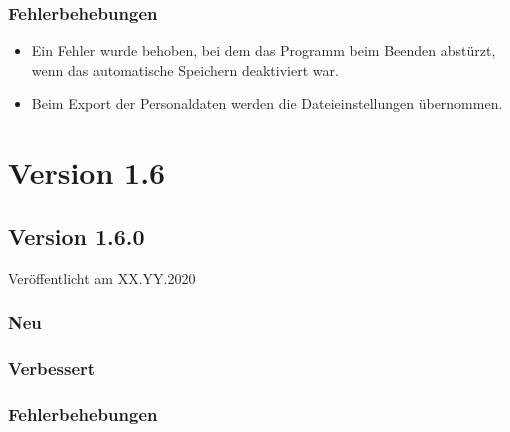 \subsubsection{Fehlerbehebungen}
\begin{itemize}
  \item
  Ein Fehler wurde behoben, bei dem das Programm beim Beenden abstürzt, wenn das automatische Speichern deaktiviert war.
  \item
  Beim Export der Personaldaten werden die Dateieinstellungen übernommen.
\end{itemize}



\section{Version 1.6}
\subsection{Version 1.6.0}
Veröffentlicht am XX.YY.2020
\subsubsection{Neu}
\subsubsection{Verbessert}
\subsubsection{Fehlerbehebungen}
